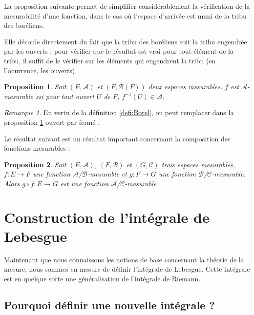 \documentclass[french]{report}
\theoremstyle{plain}
\newtheorem{prop}{Proposition}[section]
\theoremstyle{definition}
\theoremstyle{remark}
\newtheorem{rem}{Remarque}[section]
\begin{document}
La proposition suivante permet de simplifier considérablement la vérification de la mesurabilité d'une fonction, dans le cas où l'espace d'arrivée est muni de la tribu des boréliens.

Elle découle directement du fait que la tribu des boréliens soit la tribu engendrée par les ouverts :
pour vérifier que le résultat est vrai pour tout élément de la tribu, il suffit de le vérifier sur les éléments qui engendrent la tribu (en l'ocurrence, les ouverts).

\begin{prop}
  \label{prop:simp}
  Soit $\left(E, \mathcal{A}\right)$ et $\left(F, \mathcal{B}(F)\right)$ deux espaces mesurables.
  $f$ est $\mathcal{A}$-mesurable ssi pour tout ouvert $U$ de $F$, $f^{-1}(U) \in \mathcal{A}$.
\end{prop}

\begin{rem}
  En vertu de la définition \ref{defi:Borel}, on peut remplacer dans la proposition \ref{prop:simp} \og ouvert \fg par \og fermé \fg.
\end{rem}

Le résultat suivant est un résultat important concernant la composition des fonctions mesurables :

\begin{prop}
  Soit $\left(E,\mathcal{A}\right)$, $\left(F,\mathcal{B}\right)$ et $\left(G,\mathcal{C}\right)$ trois espaces mesurables,
  $f : E \longrightarrow F$ une fonction $\mathcal{A}$/$\mathcal{B}$-mesurable et $g : F \longrightarrow G$ une fonction $\mathcal{B}$/$\mathcal{C}$-mesurable.
  Alors $g \circ f : E \longrightarrow G$ est une fonction $\mathcal{A}$/$\mathcal{C}$-mesurable
\end{prop}


\chapter{Construction de l'intégrale de Lebesgue}

Maintenant que nous connaissons les notions de base concernant la théorie de la mesure, nous sommes en mesure de définir l'intégrale de Lebesgue.
Cette intégrale est en quelque sorte une généralisation de l'intégrale de Riemann.

\section{Pourquoi définir une nouvelle intégrale ?}
\end{document}
